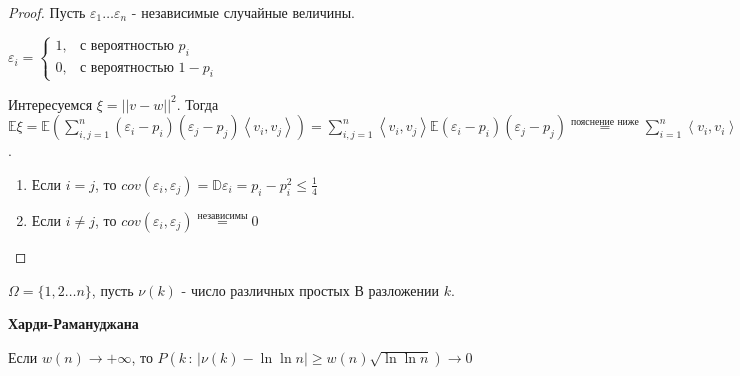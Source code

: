 \begin{proof}
    Пусть $\varepsilon_1 \ldots \varepsilon_n$ - независимые случайные величины.
    
    $
    \varepsilon_{i} = 
    \begin{cases}
        1, & \text{с вероятностью $p_i$} \\
        0, & \text{с вероятностью $1 - p_i$}
    \end{cases}
    $

    Интересуемся $\xi = || v - w ||^2$. Тогда $\mathbb{E} \xi = \mathbb{E} (\sum_{i, j = 1}^n (\varepsilon_i - p_i)(\varepsilon_j - p_j) \left < v_i, v_j \right > ) = 
    \sum_{i, j = 1}^{n} \left < v_i, v_j \right > \mathbb{E} (\varepsilon_i - p_i)(\varepsilon_j - p_j) \overset{\text{пояснение ниже}}{=} \sum_{i = 1}^{n} \left < v_i, v_i \right > (p_i - p_i^2) \leqslant \frac{n}{4}$.

    \begin{enumerate}
        \item Если $i = j$, то $cov(\varepsilon_i, \varepsilon_j) = \mathbb{D}\varepsilon_i = p_i - p_i^2 \leqslant \frac{1}{4}$
        \item Если $i \neq j$, то $cov (\varepsilon_i, \varepsilon_j) \overset{\text{независимы}}{=} 0$
    \end{enumerate}
\end{proof}

\begin{example}
    $\Omega = \{ 1, 2 \ldots n \}$, пусть $\nu (k)$ - число различных простых В
    разложении $k$.

    \begin{theorem}
        \textbf{Харди-Рамануджана}

        Если $w(n) \to +\infty$, то $P(k \, : \, | \nu (k) - \ln \ln n| \geqslant w(n) \sqrt{\ln \ln n}) \to 0$
    \end{theorem}
\end{example}

